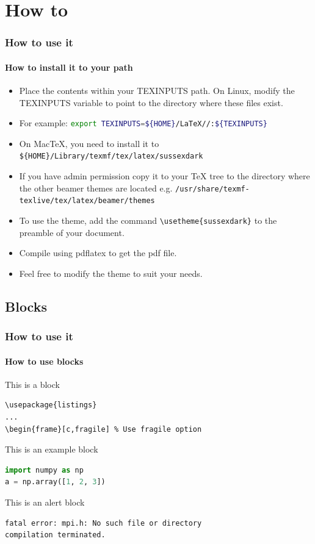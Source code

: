 \documentclass[11pt,t,aspectratio=169]{beamer}
\begin{document}
\section{How to}
\begin{frame}[c,fragile]
    \frametitle{How to use it}
    \framesubtitle{How to install it to your path}
    \begin{itemize}
        \item Place the contents within your TEXINPUTS path. On Linux, modify the TEXINPUTS variable to point to the directory where these files exist.
        \item For example: \lstinline[language=bash]|export TEXINPUTS=${HOME}/LaTeX//:${TEXINPUTS}|
        \item On MacTeX, you need to install it to \lstinline|${HOME}/Library/texmf/tex/latex/sussexdark|
        \item If you have admin permission copy it to your \TeX{} tree to the directory where the other beamer themes are located e.g. \lstinline|/usr/share/texmf-texlive/tex/latex/beamer/themes|
        \item To use the theme, add the command \lstinline[language={[LaTeX]TeX}]|\usetheme{sussexdark}| to the preamble of your document.
        \item Compile using pdflatex to get the pdf file.
        \item Feel free to modify the theme to suit your needs.
    \end{itemize}
\end{frame}
\subsection{Blocks}
\begin{frame}[c,fragile]
    \frametitle{How to use it}
    \framesubtitle{How to use blocks}
    \begin{block}{This is a block}
\begin{lstlisting}[language={[LaTeX]TeX}]
\usepackage{listings}
...
\begin{frame}[c,fragile] % Use fragile option
\end{lstlisting}
    \end{block}
    \begin{exampleblock}{This is an example block}
\begin{lstlisting}[language=Python]
import numpy as np
a = np.array([1, 2, 3])
\end{lstlisting}
    \end{exampleblock}
    \begin{alertblock}{This is an alert block}
\begin{lstlisting}[language=bash]
fatal error: mpi.h: No such file or directory
compilation terminated.
\end{lstlisting}
    \end{alertblock}
\end{frame}
\end{document}
